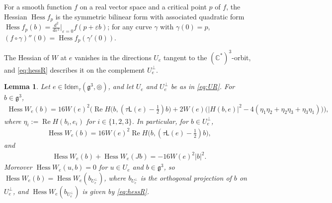 \documentclass [leqno, 10pt]{amsart}
\newtheorem{lemma}[theorem]{Lemma}%
\theoremstyle{definition}
\numberwithin{equation}{section}
\newcommand{\idem}{\mathbb{Idem}}
\newcommand{\tmlt}{\circledcirc}
\newcommand{\hess}{\operatorname{Hess}}
\newcommand{\lin}{\mathsf{L}}
\newcommand{\re}{\operatorname{Re}}
\newcommand{\g}{\mathfrak{g}}
\newcommand{\com}{\mathbb C}
\newcommand{\nnorm}[1]{\lvert #1\rvert}%
\newcommand{\Usp}{U}
\newcommand{\Uperp}{\Usp^{\perp}}
\begin{document}
For a smooth function $f$ on a real vector space and a critical point $p$ of $f$, the Hessian $\hess f_{p}$ is the symmetric bilinear form with associated quadratic form $\hess f_{p}(b) = \tfrac{d^{2}}{d\varepsilon^{2}}\big|_{\varepsilon = 0}f(p + \varepsilon b)$; for any curve $\gamma$ with $\gamma(0) = p$, $(f \circ \gamma)''(0) = \hess f_{p}(\gamma'(0))$.

The Hessian of $W$ at $e$ vanishes in the directions $\Usp_{e}$ tangent to the $(\com^{\ast})^{3}$-orbit, and \eqref{eq:hessR} describes it on the complement $\Uperp_{e}$.
\begin{lemma}\label{thm:hessW}
Let $e \in \idem_{\tau}(\g^{3}, \tmlt)$, and let $\Usp_{e}$ and $\Uperp_{e}$ be as in \eqref{eq:UR}. 
For $b \in \g^{3}$, 
\begin{align}\label{eq:hessW}
\hess W_{e}(b) = 16W(e)^{2}\Big(\re H\big(b, (\tau\lin(e) - \tfrac{1}{2})b\big) + 2W(e)\big(|H(b, e)|^{2} - 4(\eta_{1}\eta_{2} + \eta_{2}\eta_{3} + \eta_{3}\eta_{1})\big)\Big),
\end{align}
where $\eta_{i} := \re H(b_{i}, e_{i})$ for $i \in \{1, 2, 3\}$.
In particular, for $b \in \Uperp_{e}$,
\begin{align}\label{eq:hessR}
\hess W_{e}(b) = 16W(e)^{2}\re H\big(b, (\tau\lin(e) - \tfrac{1}{2})b\big),
\end{align}
and
\begin{align}\label{eq:hessJ}
\hess W_{e}(b) + \hess W_{e}(Jb) = -16W(e)^{2}\nnorm{b}^{2}.
\end{align}
Moreover $\hess W_{e}(u, b) = 0$ for $u \in \Usp_{e}$ and $b \in \g^{3}$, so $\hess W_{e}(b) = \hess W_{e}(b_{\Uperp_{e}})$, where $b_{\Uperp_{e}}$ is the orthogonal projection of $b$ on $\Uperp_{e}$, and $\hess W_{e}(b_{\Uperp_{e}})$ is given by \eqref{eq:hessR}.
\end{lemma}
\end{document}
